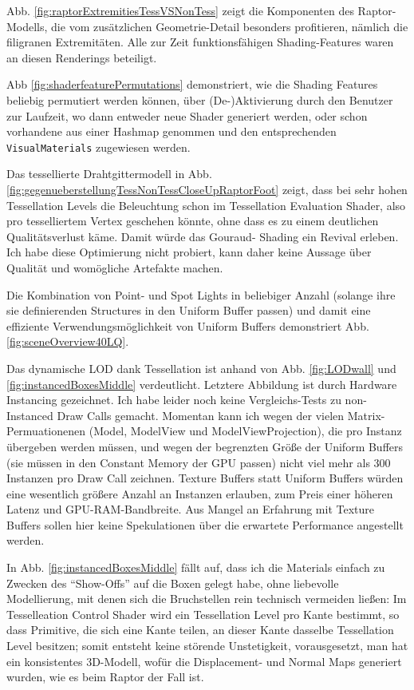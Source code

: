 	Abb. \ref{fig:raptorExtremitiesTessVSNonTess} zeigt die Komponenten des Raptor-Modells, die vom
	zusätzlichen Geometrie-Detail besonders profitieren, nämlich die filigranen Extremitäten.
	Alle zur Zeit funktionsfähigen Shading-Features waren an diesen Renderings beteiligt.
	
	Abb \ref{fig:shaderfeaturePermutations} demonstriert, wie die Shading Features beliebig permutiert werden können,
	über (De-)Aktivierung durch den Benutzer zur Laufzeit, wo dann entweder neue Shader generiert werden, oder schon 
	vorhandene aus einer Hashmap genommen und den entsprechenden \lstinline|VisualMaterials| zugewiesen werden.
	
	Das tessellierte Drahtgittermodell in Abb. \ref{fig:gegenueberstellungTessNonTessCloseUpRaptorFoot}
	zeigt, dass bei sehr hohen Tessellation Levels die Beleuchtung schon im Tessellation Evaluation Shader,
	also pro tesselliertem Vertex geschehen könnte, ohne dass es zu einem deutlichen Qualitätsverlust käme.
	Damit würde das Gouraud- Shading ein Revival erleben. Ich habe diese Optimierung nicht probiert, kann daher 
	keine Aussage über Qualität und womögliche Artefakte machen.
	
	Die Kombination von Point- und Spot Lights in beliebiger Anzahl (solange ihre sie definierenden
	Structures in den Uniform Buffer passen) und damit eine effiziente Verwendungsmöglichkeit von
	Uniform Buffers demonstriert Abb. \ref{fig:sceneOverview40LQ}.
	
	Das dynamische LOD dank Tessellation ist anhand von Abb. \ref{fig:LODwall} und \ref{fig:instancedBoxesMiddle}
	verdeutlicht. Letztere Abbildung ist durch Hardware Instancing gezeichnet. Ich habe leider noch keine 
	Vergleichs-Tests zu non-Instanced Draw Calls gemacht. Momentan kann ich wegen der vielen Matrix-Permuationenen
	(Model, ModelView und ModelViewProjection), die pro Instanz übergeben werden müssen, und wegen der 
	begrenzten Größe der Uniform Buffers (sie müssen in den	Constant Memory der GPU passen) nicht viel mehr als 300
	Instanzen pro Draw Call zeichnen. Texture Buffers statt Uniform Buffers würden eine wesentlich größere
	Anzahl an Instanzen erlauben, zum Preis einer höheren Latenz und GPU-RAM-Bandbreite. Aus Mangel an Erfahrung 
	mit Texture Buffers sollen hier keine Spekulationen über die erwartete Performance angestellt werden.
	
	In Abb. \ref{fig:instancedBoxesMiddle} fällt auf, dass ich die Materials einfach zu Zwecken des "`Show-Offs"'
	auf die Boxen gelegt habe, ohne liebevolle Modellierung, mit denen sich die Bruchstellen rein technisch
	vermeiden ließen:
	Im Tesselleation Control Shader wird ein Tessellation Level pro Kante bestimmt, so dass Primitive, die sich eine
	Kante teilen, an dieser Kante dasselbe Tessellation Level besitzen; somit entsteht keine störende Unstetigkeit,
	vorausgesetzt, man hat ein konsistentes 3D-Modell, wofür die Displacement- und Normal Maps 
	generiert wurden, wie es beim Raptor der Fall ist.
	



